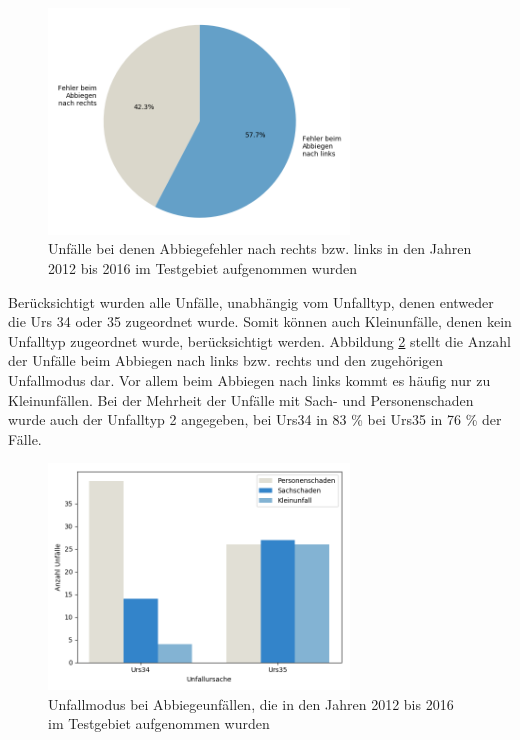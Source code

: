 \begin{savenotes}
	\begin{figure}[H]
		\centering
		\includegraphics[width=8cm,height=6cm]{figures/These_1}
		\caption[Unfälle bei denen Abbiegefehler nach rechts bzw. links in den Jahren 2012 bis 2016 im Testgebiet aufgenommen wurden]{Unfälle bei denen Abbiegefehler nach rechts bzw. links in den Jahren 2012 bis 2016 im Testgebiet aufgenommen wurden}\label{fig:Abbiegen_rechts_links}
	\end{figure}
\end{savenotes}

Berücksichtigt wurden alle Unfälle, unabhängig vom Unfalltyp, denen entweder die \ac{Urs} 34 oder 35 zugeordnet wurde. Somit können auch Kleinunfälle, denen kein Unfalltyp zugeordnet wurde, berücksichtigt werden. Abbildung \ref{fig:Abbiegen_Md} stellt die Anzahl der Unfälle beim Abbiegen nach links bzw. rechts und den zugehörigen Unfallmodus dar. Vor allem beim Abbiegen nach links kommt es häufig nur zu Kleinunfällen.
Bei der Mehrheit der Unfälle mit Sach- und Personenschaden wurde auch der Unfalltyp 2 angegeben, bei Urs34 in 83 \% bei Urs35 in 76 \% der Fälle.

\begin{savenotes}
	\begin{figure}[H]
		\centering
		\includegraphics[width=8cm,height=6cm]{figures/Abbiegen_Md}
		\caption[Unfallmodus bei Abbiegeunfällen, die in den Jahren 2012 bis 2016 im Testgebiet aufgenommen wurden]{Unfallmodus bei Abbiegeunfällen, die in den Jahren 2012 bis 2016 im Testgebiet aufgenommen wurden}\label{fig:Abbiegen_Md}
	\end{figure}
\end{savenotes}

